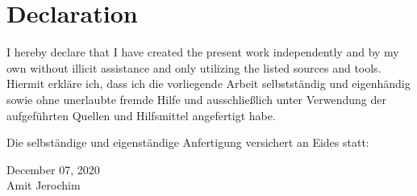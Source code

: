 
\cleardoublepage
\section*{Declaration}
I hereby declare that I have created the present work independently and by my own without illicit assistance and only utilizing the listed sources and tools.\\

Hiermit erkläre ich, dass ich die vorliegende Arbeit selbstständig und eigenhändig sowie ohne unerlaubte fremde Hilfe und ausschließlich unter Verwendung der aufgeführten Quellen und Hilfsmittel angefertigt habe.

Die selbständige und eigenständige Anfertigung versichert an Eides statt:
\begin{center}
December 07, 2020\\[3pc]
Amit Jerochim
\end{center}
